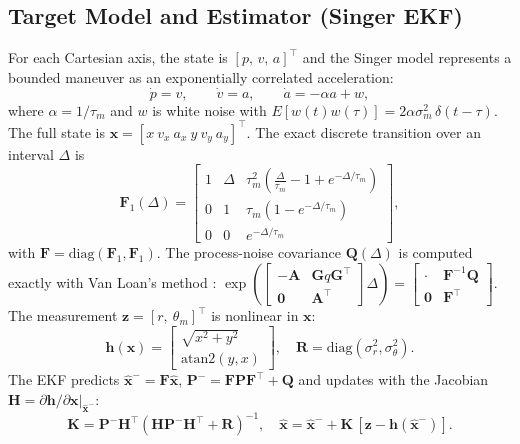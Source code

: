 \documentclass[conference]{IEEEtran}
\newcommand{\vect}[1]{\mathbf{#1}}
\begin{document}
\subsection{Target Model and Estimator (Singer EKF)}
For each Cartesian axis, the state is $[p,\,v,\,a]^\top$ and the Singer model
\cite{singer1970,li2003} represents a bounded maneuver as an exponentially
correlated acceleration:
\begin{equation}
\dot p=v,\qquad \dot v=a,\qquad \dot a=-\alpha a+w,
\end{equation}
where $\alpha=1/\tau_m$ and $w$ is white noise with
$E[w(t)w(\tau)]=2\alpha\sigma_m^2\,\delta(t-\tau)$. The full state is
$\vect x=[x\ v_x\ a_x\ y\ v_y\ a_y]^\top$. The exact discrete transition over
an interval $\Delta$ is
\begin{equation}
\vect F_1(\Delta)=\begin{bmatrix}1&\Delta&\tau_m^2\!\left(\frac{\Delta}{\tau_m}-1+e^{-\Delta/\tau_m}\right)\\
0&1&\tau_m\left(1-e^{-\Delta/\tau_m}\right)\\0&0&e^{-\Delta/\tau_m}\end{bmatrix},
\end{equation}
with $\vect F=\mathrm{diag}(\vect F_1,\vect F_1)$. The process-noise covariance
$\vect Q(\Delta)$ is computed exactly with Van Loan's method \cite{vanloan1978}:
$\exp\!\left(\begin{bmatrix}-\vect A & \vect G q\vect G^\top\\ \vect 0&\vect A^\top\end{bmatrix}\Delta\right)
=\begin{bmatrix}\cdot&\vect F^{-1}\vect Q\\ \vect 0&\vect F^\top\end{bmatrix}$.
The measurement $\vect z=[r,\ \theta_m]^\top$ is nonlinear in $\vect x$:
\begin{equation}
\vect h(\vect x)=\begin{bmatrix}\sqrt{x^2+y^2}\\ \mathrm{atan2}(y,x)\end{bmatrix},\quad
\vect R=\mathrm{diag}(\sigma_r^2,\sigma_\theta^2).
\end{equation}
The EKF \cite{barshalom2001} predicts
$\hat{\vect x}^-=\vect F\hat{\vect x}$, $\vect P^-=\vect F\vect P\vect F^\top+\vect Q$
and updates with the Jacobian
$\vect H=\partial\vect h/\partial\vect x|_{\hat{\vect x}^-}$:
\begin{equation}
\vect K=\vect P^-\vect H^\top(\vect H\vect P^-\vect H^\top+\vect R)^{-1},\quad
\hat{\vect x}=\hat{\vect x}^-+\vect K\,[\vect z-\vect h(\hat{\vect x}^-)].
\end{equation}
\end{document}
